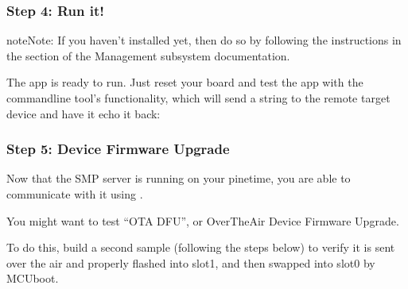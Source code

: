 \documentclass[letterpaper,10pt,english]{sphinxmanual}
\begin{document}
\begin{sphinxVerbatim}[commandchars=\\\{\}]
\end{sphinxVerbatim}


\subsubsection{Step 4: Run it!}
\label{\detokenize{fota/smp_svr:step-4-run-it}}
\begin{sphinxadmonition}{note}{Note:}
If you haven’t installed  yet, then do so by following the
instructions in the  section of the Management subsystem
documentation.
\end{sphinxadmonition}

The  app is ready to run.  Just reset your board and test the app
with the  command\sphinxhyphen{}line tool’s  functionality, which will
send a string to the remote target device and have it echo it back:

\begin{sphinxVerbatim}[commandchars=\\\{\}]
\end{sphinxVerbatim}


\subsubsection{Step 5: Device Firmware Upgrade}
\label{\detokenize{fota/smp_svr:step-5-device-firmware-upgrade}}
Now that the SMP server is running on your pinetime, you are able to communicate
with it using .

You might want to test “OTA DFU”, or Over\sphinxhyphen{}The\sphinxhyphen{}Air Device Firmware Upgrade.

To do this, build a second sample (following the steps below) to verify
it is sent over the air and properly flashed into slot\sphinxhyphen{}1, and then
swapped into slot\sphinxhyphen{}0 by MCUboot.

\begin{sphinxVerbatim}[commandchars=\\\{\}]
    
    
     
\end{sphinxVerbatim}
\end{document}
